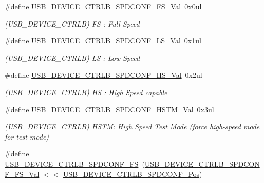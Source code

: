 \begin{DoxyCompactItemize}
\item 
\#define \mbox{\hyperlink{group___s_a_m_d21___u_s_b_ga3be2b809af4ab86f679b64a276ff0cb9}{U\+S\+B\+\_\+\+D\+E\+V\+I\+C\+E\+\_\+\+C\+T\+R\+L\+B\+\_\+\+S\+P\+D\+C\+O\+N\+F\+\_\+\+F\+S\+\_\+\+Val}}~0x0ul
\begin{DoxyCompactList}\small\item\em (U\+S\+B\+\_\+\+D\+E\+V\+I\+C\+E\+\_\+\+C\+T\+R\+LB) FS \+: Full Speed \end{DoxyCompactList}\item 
\#define \mbox{\hyperlink{group___s_a_m_d21___u_s_b_ga8734dfea787a3ab59ab0704d1a81ca76}{U\+S\+B\+\_\+\+D\+E\+V\+I\+C\+E\+\_\+\+C\+T\+R\+L\+B\+\_\+\+S\+P\+D\+C\+O\+N\+F\+\_\+\+L\+S\+\_\+\+Val}}~0x1ul
\begin{DoxyCompactList}\small\item\em (U\+S\+B\+\_\+\+D\+E\+V\+I\+C\+E\+\_\+\+C\+T\+R\+LB) LS \+: Low Speed \end{DoxyCompactList}\item 
\#define \mbox{\hyperlink{group___s_a_m_d21___u_s_b_gaf86110a47503261b362a0efa2d2c83a3}{U\+S\+B\+\_\+\+D\+E\+V\+I\+C\+E\+\_\+\+C\+T\+R\+L\+B\+\_\+\+S\+P\+D\+C\+O\+N\+F\+\_\+\+H\+S\+\_\+\+Val}}~0x2ul
\begin{DoxyCompactList}\small\item\em (U\+S\+B\+\_\+\+D\+E\+V\+I\+C\+E\+\_\+\+C\+T\+R\+LB) HS \+: High Speed capable \end{DoxyCompactList}\item 
\#define \mbox{\hyperlink{group___s_a_m_d21___u_s_b_gadbc04e8c5b3f542b3f498c7397f9700d}{U\+S\+B\+\_\+\+D\+E\+V\+I\+C\+E\+\_\+\+C\+T\+R\+L\+B\+\_\+\+S\+P\+D\+C\+O\+N\+F\+\_\+\+H\+S\+T\+M\+\_\+\+Val}}~0x3ul
\begin{DoxyCompactList}\small\item\em (U\+S\+B\+\_\+\+D\+E\+V\+I\+C\+E\+\_\+\+C\+T\+R\+LB) H\+S\+TM\+: High Speed Test Mode (force high-\/speed mode for test mode) \end{DoxyCompactList}\item 
\#define \mbox{\hyperlink{group___s_a_m_d21___u_s_b_gad9d863f2b485961b88ec521ef2ae6410}{U\+S\+B\+\_\+\+D\+E\+V\+I\+C\+E\+\_\+\+C\+T\+R\+L\+B\+\_\+\+S\+P\+D\+C\+O\+N\+F\+\_\+\+FS}}~(\mbox{\hyperlink{group___s_a_m_d21___u_s_b_ga3be2b809af4ab86f679b64a276ff0cb9}{U\+S\+B\+\_\+\+D\+E\+V\+I\+C\+E\+\_\+\+C\+T\+R\+L\+B\+\_\+\+S\+P\+D\+C\+O\+N\+F\+\_\+\+F\+S\+\_\+\+Val}} $<$$<$ \mbox{\hyperlink{group___s_a_m_d21___u_s_b_gab5b9688f10e2ab8aa52f42628139b6eb}{U\+S\+B\+\_\+\+D\+E\+V\+I\+C\+E\+\_\+\+C\+T\+R\+L\+B\+\_\+\+S\+P\+D\+C\+O\+N\+F\+\_\+\+Pos}})
$$
\end{DoxyCompactItemize}
